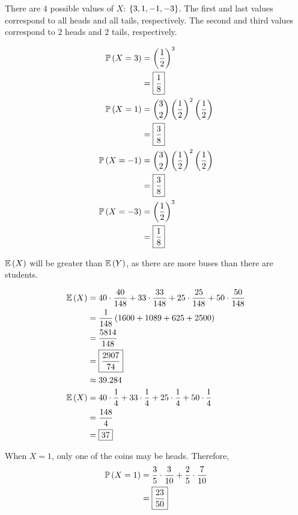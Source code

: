 \documentclass{article}
\begin{document}
\setcounter{problem}{5}
\problem{}
There are $4$ possible values of $X$: $\left \{ 3, 1, -1, -3 \right \}$.
The first and last values correspond to all heads and all tails,
respectively.
The second and third values correspond to $2$ heads and $2$ tails,
respectively.

\begin{align*}
  \mathbb{P} \left ( X = 3 \right) &= \left (\frac{1}{2} \right)^3 \\
             &= \boxed{\frac{1}{8}} \\
  \mathbb{P} \left ( X = 1 \right) &= \binom{3}{2} \left (\frac{1}{2} \right)^2 \left (\frac{1}{2} \right) \\
             &= \boxed{\frac{3}{8}} \\
  \mathbb{P} \left ( X = -1 \right) &= \binom{3}{2} \left (\frac{1}{2} \right)^2 \left (\frac{1}{2} \right) \\
             &= \boxed{\frac{3}{8}} \\
   \mathbb{P} \left ( X = -3 \right) &= \left (\frac{1}{2} \right)^3 \\
             &= \boxed{\frac{1}{8}} \\
\end{align*}


\setcounter{problem}{20}
\problem{}
\subproblema{}

$\mathbb{E} \left ( X \right)$ will be greater than $\mathbb{E} \left ( Y \right)$,
as there are more buses than there are students.

\subproblema{}
\begin{align*}
  \mathbb{E} \left ( X \right) &= 40 \cdot \frac{40}{148} + 33 \cdot \frac{33}{148} + 25 \cdot \frac{25}{148} + 50 \cdot \frac{50}{148} \\
         &= \frac{1}{148} \left (1600 + 1089 + 625 + 2500 \right) \\
         &= \frac{5814}{148} \\
         &= \boxed{\frac{2907}{74}} \\
         & \approx 39.284 \\
  \mathbb{E} \left ( X \right) &= 40 \cdot \frac{1}{4} + 33 \cdot \frac{1}{4} + 25 \cdot \frac{1}{4} + 50 \cdot \frac{1}{4} \\
         &= \frac{148}{4} \\
         &= \boxed{37} \\
\end{align*}

\setcounter{problem}{24}
\problem{}
\subproblema{}
When $X=1$, only one of the coins may be heads.
Therefore,
\begin{align*}
  \mathbb{P} \left ( X = 1 \right) &= \frac{3}{5} \cdot \frac{3}{10} + \frac{2}{5} \cdot \frac{7}{10} \\
             &= \boxed{\frac{23}{50}} \\
\end{align*}
\end{document}
